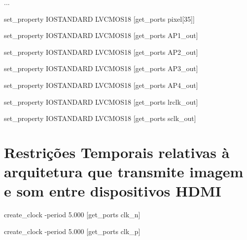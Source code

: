 ...

set\_property IOSTANDARD LVCMOS18 [get\_ports {pixel[35]}]

set\_property IOSTANDARD LVCMOS18 [get\_ports AP1\_out]

set\_property IOSTANDARD LVCMOS18 [get\_ports AP2\_out]

set\_property IOSTANDARD LVCMOS18 [get\_ports AP3\_out]

set\_property IOSTANDARD LVCMOS18 [get\_ports AP4\_out]

set\_property IOSTANDARD LVCMOS18 [get\_ports lrclk\_out]

set\_property IOSTANDARD LVCMOS18 [get\_ports sclk\_out]



\section{Restrições Temporais relativas à arquitetura que transmite imagem e som entre dispositivos HDMI} \label{ap:temporais_planC}
\small{
	create\_clock -period 5.000 [get\_ports clk\_n]

	create\_clock -period 5.000 [get\_ports clk\_p]	
}




